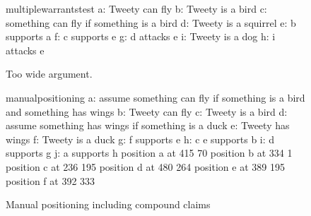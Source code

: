 \documentclass[a4paper]{article}
\begin{document}
\begin{figure}[h]
	\centering
	\begin{haslpicture}[scale=0.5]{multiplewarrantstest}
		a: Tweety can fly
		b: Tweety is a bird
		c: something can fly if something is a bird
		d: Tweety is a squirrel
		e: b supports a
		f: c supports e
		g: d attacks e
		i: Tweety is a dog
		h: i attacks e
	\end{haslpicture}
	\caption{Too wide argument.}
	\label{fig:hasl1evalconjunctiontort}
\end{figure}

\begin{figure}[h]
	\centering
	\begin{haslpicture}[scale=0.5]{manualpositioning}
		a: assume something can fly if something is a bird and something has wings
		b: Tweety can fly
		c: Tweety is a bird
		d: assume something has wings if something is a duck
		e: Tweety has wings
		f: Tweety is a duck
		g: f supports e
		h: c e supports b
		i: d supports g
		j: a supports h
		position a at 415 70
		position b at 334 1
		position c at 236 195
		position d at 480 264
		position e at 389 195
		position f at 392 333
	\end{haslpicture}
	\caption{Manual positioning including compound claims}
\end{figure}
\end{document}
